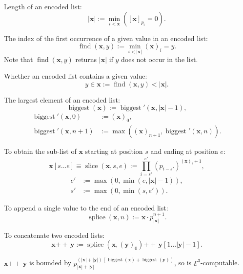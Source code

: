 \documentclass[a4paper]{article}
\newcommand{\grz}[1]{$\mathcal{E}^{#1}$}	%
\newcommand{\xvec}{\mathbf{x}}	%
\newcommand{\yvec}{\mathbf{y}}	%
\newcommand{\recurN}[1]{\begin{equation*} \begin{split} #1 \end{split} \end{equation*}}	%
\newcommand{\concat}{\ensuremath{+\!\!\!\!+\,}}	%
\newcommand{\find}{\operatorname{find}}
\theoremstyle{plain}
\theoremstyle{definition}
\begin{document}
Length of an encoded list:
\begin{equation} |\xvec| := \min_{i < \xvec} \left([\xvec]_{p_i} = 0  \right).\end{equation}

The index of the first occurrence of a given value in an encoded list:
\begin{equation} \find(\xvec,y) := \min_{i < |\xvec|} (\xvec)_i = y. \end{equation}
Note that $\find(\xvec,y)$ returns $|\xvec|$ if $y$ does not occur in the list.

Whether an encoded list contains a given value:
\begin{equation} y \in \xvec := \find(\xvec,y) < |\xvec|. \end{equation}

The largest element of an encoded list:
\begin{equation} \operatorname{biggest}(\xvec) := \operatorname{biggest}'(\xvec,|\xvec|-1), \end{equation}
\recurN{
	\operatorname{biggest}'(\xvec,0) &:= (\xvec)_0, \\ 
	\operatorname{biggest}'(\xvec,n+1) &:= \max \left ( (\xvec)_{n+1},\operatorname{biggest}'(\xvec,n) \right ).
}

To obtain the sub-list of $\xvec$ starting at position $s$ and ending at position $e$:
\begin{equation} \xvec[s \dots e] \equiv \operatorname{slice}(\xvec,s,e) := \prod_{i=s'}^{e'}(p_{i-s'})^{(\xvec)_i+1}, \end{equation}
\begin{equation*} 
\begin{split}
	e' &:= \max(0,\min(e,|\xvec|-1)), \\ 
	s' &:= \max(0,\min(s,e')). 
\end{split}
\end{equation*}

To append a single value to the end of an encoded list:
\begin{equation} \operatorname{splice}(\xvec,n) := \xvec \cdot p_{|\xvec|}^{n+1}. \end{equation}

To concatenate two encoded lists:
\begin{equation} \xvec \concat \yvec := \operatorname{splice}(\xvec,(\yvec)_0) \concat \yvec[1 \dots |\yvec|-1]. \end{equation}

$\xvec \concat \yvec$ is bounded by $p_{|\xvec|+|\yvec|}^{(|\xvec|+|\yvec|) (\operatorname{biggest}(\xvec)+\operatorname{biggest}(\yvec))}$, so is \grz{3}-computable.
\end{document}
